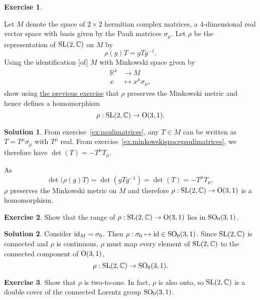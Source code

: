 \documentclass[11pt, a4paper]{report}
\theoremstyle{definition}
\newtheorem{exercise}{Exercise}[part]
\newtheorem{solution}{Solution}[part]
\newenvironment{ex}{\begin{exercise}}{\end{exercise}\pagebreak[1]}
\newenvironment{sol}{\begin{solution}}{\end{solution}\pagebreak[3]}
\newcommand*{\SL}{\ensuremath\text{SL}}
\renewcommand*{\O}{\ensuremath\text{O}}
\newcommand*{\SO}{\ensuremath\text{SO}}
\newcommand*{\op}[1]{\ensuremath\mathop{}\mathopen{}#1}
\newcommand*{\id}{\op{\mathrm{id}}}
\begin{document}
\begin{ex}\label{ex:slrepresentation}

Let $M$ denote the space of $2 \times 2$ hermitian complex matrices, a 4-dimensional real vector space with basis given by the Pauli matrices $\sigma_\mu$.
Let $\rho$ be the representation of $\SL(2, \mathbb{C})$ on $M$ by
\[
    \rho(g) T = g T g^{-1}.
\]
Using the identification [of] $M$ with Minkowski space given by
\begin{align*}
    \mathbb{R}^4 &\to M \\
    x            &\mapsto x^\mu \sigma_\mu,
\end{align*}
show using \hyperref[ex:minkowskispacepaulimatrices]{the previous exercise} that $\rho$ preserves the Minkowski metric and hence defines a homomorphism
\[
    \rho: \SL(2, \mathbb{C}) \to \O(3, 1).
\]

\end{ex}

\begin{sol}

From exercise~\ref{ex:paulimatrices}, any $T \in M$ can be written as $T = T^\mu \sigma_\mu$ with $T^\mu$ real.
From exercise~\ref{ex:minkowskispacepaulimatrices}, we therefore have $\det(T) = -T^\mu T_\mu$.

As
\[
    \det\bigl( \rho(g) T \bigr) = \det(g T g^{-1}) = \det(T) = -T^\mu T_\mu,
\]
$\rho$ preserves the Minkowski metric on $M$ and therefore $\rho: \SL(2, \mathbb{C}) \to \O(3, 1)$ is a homomorphism.

\end{sol}

\begin{ex}

Show that the range of $\rho: \SL(2, \mathbb{C}) \to \O(3, 1)$ lies in $\SO_0(3, 1)$.

\end{ex}

\begin{sol}

Consider $\id_M = \sigma_0$. Then $\rho: \sigma_0 \mapsto \id \in \SO_0(3, 1)$.
Since $\SL(2, \mathbb{C})$ is connected and $\rho$ is continuous, $\rho$ must map every element of $\SL(2, \mathbb{C})$ to the connected component of $\O(3, 1)$,
\[
    \rho: \SL(2, \mathbb{C}) \to \SO_0(3, 1).
\]

\end{sol}

\begin{ex}

Show that $\rho$ is two-to-one. In fact, $\rho$ is also onto, so $\SL(2, \mathbb{C})$ is a double cover of the connected Lorentz group $\SO_0(3, 1)$.

\end{ex}
\end{document}
